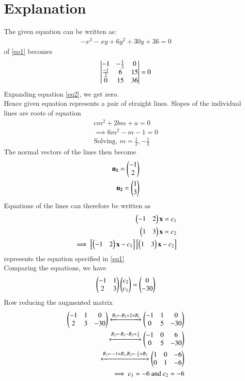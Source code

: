 \documentclass[journal,12pt,twocolumn]{IEEEtran}
\begin{document}
\section{Explanation}
The given equation can be written as:
\begin{align}
-x^2-xy+6y^2+30y+36=0 \label{eq1}
\end{align}
 of \eqref{eq1} becomes
\begin{align}
    \begin{vmatrix}-1&-\frac{1}{2}&0\\\frac{-1}{2}&6&15\\0&15&36\end{vmatrix}=0\label{eq2}
\end{align}
Expanding equation \eqref{eq2}, we get zero.\\
Hence given equation represents a pair of straight lines.
Slopes of the individual lines are roots of equation 
\begin{align}
    cm^2+2bm+a=0\\
    \implies 6m^2-m-1=0\\
    \text{Solving, }m=\frac{1}{2},-\frac{1}{3}
\end{align}
The normal vectors of the lines then become
\begin{align}
    \mathbf{n_1}=\begin{pmatrix}-1\\2\end{pmatrix}\\
    \mathbf{n_2}=\begin{pmatrix}1\\3\end{pmatrix}
\end{align}
Equations of the lines can therefore be written as
\begin{align}
  \begin{pmatrix}-1&2\end{pmatrix}\mathbf{x}=c_1\\
   \begin{pmatrix}1&3\end{pmatrix}\mathbf{x}=c_2\\
  \implies \left[\begin{pmatrix}-1&2\end{pmatrix}\mathbf{x}-c_1\right]\left[\begin{pmatrix}1&3\end{pmatrix}\mathbf{x}-c_2\right]
\end{align}
represents the equation specified in \eqref{eq1}\\
Comparing the equations, we have
\begin{align}
    \begin{pmatrix}-1&1\\2&3\end{pmatrix}\begin{pmatrix}c_2\\c_1\end{pmatrix}=\begin{pmatrix}0\\-30\end{pmatrix}\\
 \end{align}
 Row reducing the augmented matrix
 \begin{align}
    \begin{pmatrix}-1&1&0\\2&3&-30\end{pmatrix}\xleftrightarrow[]{R_2\leftarrow R_2+2\times R_1}
    \begin{pmatrix}-1&1&0\\0&5&-30\end{pmatrix}\\
    \xleftrightarrow[]{R_2\leftarrow R_1- R_2\times \frac{1}{5}}
    \begin{pmatrix}-1&0&6\\0&5&-30\end{pmatrix}\\
    \xleftrightarrow[]{R_1\leftarrow -1\times R_1  , R_2\leftarrow \frac{1}{5}\times R_2}
    \begin{pmatrix}1&0&-6\\0&1&-6\end{pmatrix}\\
    \implies c_1=-6 \text{ and }c_2=-6
\end{align}
\end{document}
